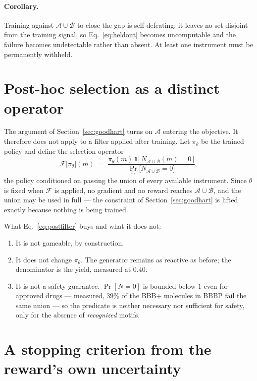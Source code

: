 \documentclass[11pt]{article}
\newcommand{\1}{\mathbb{1}}
\begin{document}
\paragraph{Corollary.} Training against $\mathcal{A} \cup \mathcal{B}$ to
close the gap is self-defeating: it leaves no set disjoint from the
training signal, so Eq.~\eqref{eq:heldout} becomes uncomputable and the
failure becomes undetectable rather than absent. At least one instrument
must be permanently withheld.

\section{Post-hoc selection as a distinct operator}
\label{sec:postfilter}

The argument of Section~\ref{sec:goodhart} turns on $\mathcal{A}$ entering
the objective. It therefore does not apply to a filter applied after
training. Let $\pi_\theta$ be the trained policy and define the selection
operator
\begin{equation}
\mathcal{F}\big[\pi_\theta\big](m) \;=\;
\frac{\pi_\theta(m)\,\1\big[\,N_{\mathcal{A}\cup\mathcal{B}}(m) = 0\,\big]}
     {\Pr_{\pi_\theta}\!\big[N_{\mathcal{A}\cup\mathcal{B}} = 0\big]},
\label{eq:postfilter}
\end{equation}
the policy conditioned on passing the union of every available instrument.
Since $\theta$ is fixed when $\mathcal{F}$ is applied, no gradient and no
reward reaches $\mathcal{A} \cup \mathcal{B}$, and the union may be used
in full --- the constraint of Section~\ref{sec:goodhart} is lifted exactly
because nothing is being trained.

What Eq.~\eqref{eq:postfilter} buys and what it does not:
\begin{enumerate}[nosep]
  \item It is not gameable, by construction.
  \item It does not change $\pi_\theta$. The generator remains as reactive
  as before; the denominator is the yield, measured at $0.40$.
  \item It is not a safety guarantee. $\Pr[N=0]$ is bounded below $1$ even
  for approved drugs --- measured, $39\%$ of the BBB$+$ molecules in BBBP
  fail the same union --- so the predicate is neither necessary nor
  sufficient for safety, only for the absence of \emph{recognized} motifs.
\end{enumerate}

\section{A stopping criterion from the reward's own uncertainty}
\label{sec:snr}
\end{document}
